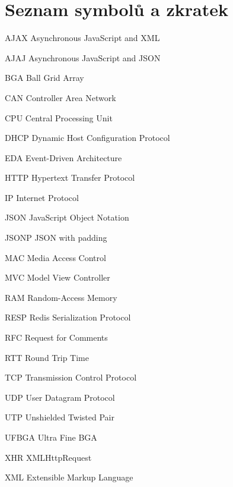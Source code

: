 \documentclass[oneside,12pt,a4paper,final]{book} %
\makeatletter
\newcommand{\tocfill}{\cleaders\hbox{$\m@th \mkern\@dotsep mu . \mkern\@dotsep mu$}\hfill}
\newcommand{\abbrlabel}[1]{\makebox[6cm][l]{\textbf{#1}\ \tocfill}}
\newenvironment{abbreviations}{\begin{list}{}{\renewcommand{\makelabel}{\abbrlabel}%
        \setlength{\labelwidth}{6cm}\setlength{\leftmargin}{\labelwidth+\labelsep}%
                                              \setlength{\itemsep}{0pt}}}{\end{list}}
\makeatother
\begin{document}
\chapter*{Seznam symbolů a zkratek}
\noindent
\begin{abbreviations}
\item[AJAX]		Asynchronous JavaScript and XML
\item[AJAJ]		Asynchronous JavaScript and JSON
\item[BGA]		Ball Grid Array
\item[CAN]		Controller Area Network
\item[CPU]		Central Processing Unit
\item[DHCP]		Dynamic Host Configuration Protocol
\item[EDA]		Event-Driven Architecture
\item[HTTP]		Hypertext Transfer Protocol
\item[IP]		Internet Protocol
\item[JSON]		JavaScript Object Notation
\item[JSONP]	JSON with padding
\item[MAC]		Media Access Control
\item[MVC]		Model View Controller
\item[RAM]		Random-Access Memory
\item[RESP]		Redis Serialization Protocol
\item[RFC]		Request for Comments
\item[RTT]		Round Trip Time
\item[TCP]		Transmission Control Protocol
\item[UDP]		User Datagram Protocol
\item[UTP]		Unshielded Twisted Pair
\item[UFBGA]	Ultra Fine BGA
\item[XHR]		XMLHttpRequest
\item[XML]		Extensible Markup Language
\end{abbreviations}









\end{document}
